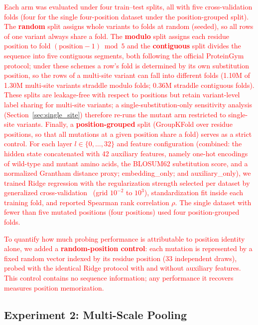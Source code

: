 \documentclass[11pt,a4paper]{article}
\newcommand{\rev}[1]{\textcolor{red}{#1}}
\begin{document}
\textcolor{red}{\rev{Each arm was evaluated under four train--test splits, all with five
cross-validation folds (four for the single four-position dataset under the
position-grouped split). The \textbf{random} split assigns whole variants to
folds at random (seeded), so all rows of one variant always share a fold. The
\textbf{modulo} split assigns each residue position to fold
$(\text{position} - 1) \bmod 5$ and the \textbf{contiguous} split divides the
sequence into five contiguous segments, both following the official ProteinGym
protocol; under these schemes a row's fold is determined by its own
substitution position, so the rows of a multi-site variant can fall into
different folds (1.10M of 1.30M multi-site variants straddle modulo folds;
0.36M straddle contiguous folds). These splits are leakage-free with respect to
positions but retain variant-level label sharing for multi-site variants; a
single-substitution-only sensitivity analysis
(Section~\ref{sec:single_site}) therefore re-runs the mutant arm restricted to
single-site variants. Finally, a \textbf{position-grouped} split (GroupKFold
over residue positions, so that all mutations at a given position share a fold)
serves as a strict control. For each layer $l \in \{0,\dots,32\}$ and
feature configuration (combined: the hidden state concatenated with 42 auxiliary
features, namely one-hot encodings of wild-type and mutant amino acids, the BLOSUM62
substitution score, and a normalized Grantham distance proxy; embedding\_only; and
auxiliary\_only), we trained Ridge regression with the regularization strength
selected per dataset by generalized cross-validation~\cite{golub1979generalized}
(grid $10^{-2}$ to $10^{3}$), standardization fit inside each training fold, and
reported Spearman rank correlation $\rho$. The single
dataset with fewer than five mutated positions (four positions) used four
position-grouped folds.}}

\textcolor{red}{\rev{To quantify how much probing performance is attributable to position identity
alone, we added a \textbf{random-position control}: each mutation is represented by a
fixed random vector indexed by its residue position (33 independent draws), probed with
the identical Ridge protocol with and without auxiliary features. This control contains
no sequence information; any performance it recovers measures position memorization.}}

\subsection{Experiment 2: Multi-Scale Pooling}
\end{document}
